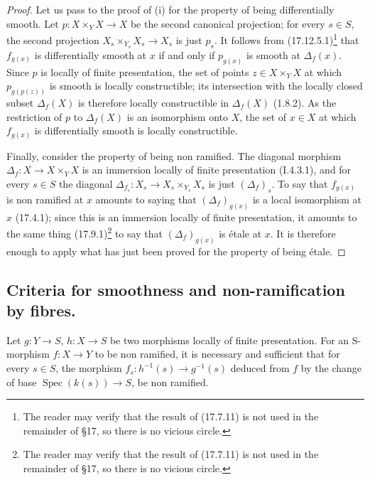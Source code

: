 \begin{proof}
Let us pass to the proof of (i) for the property of being differentially smooth.
Let $p:X\times_Y X\to X$ be the second canonical projection; for every $s\in S$, the second projection $X_s\times_{Y_s}X_s\to X_s$ is just $p_s$.
It follows from (17.12.5.1)\footnote{The reader may verify that the result of (17.7.11) is not used in the remainder of \S17, so there is no vicious circle.} that $f_{g(x)}$ is differentially smooth at $x$ if and only if $p_{g(x)}$ is smooth at $\Delta_f(x)$.
Since $p$ is locally of finite presentation, the set of points $z\in X\times_Y X$ at which $p_{g(p(z))}$ is smooth is locally constructible; its intersection with the locally closed subset $\Delta_f(X)$ is therefore locally constructible in $\Delta_f(X)$ (1.8.2).
As the restriction of $p$ to $\Delta_f(X)$ is an isomorphism onto $X$, the set of $x\in X$ at which $f_{g(x)}$ is differentially smooth is locally constructible.

Finally, consider the property of being non ramified.
The diagonal morphism $\Delta_f:X\to X\times_Y X$ is an immersion locally of finite presentation (I.4.3.1), and for every $s\in S$ the diagonal $\Delta_{f_s}:X_s\to X_s\times_{Y_s}X_s$ is just $(\Delta_f)_s$.
To say that $f_{g(x)}$ is non ramified at $x$ amounts to saying that $(\Delta_f)_{g(x)}$ is a local isomorphism at $x$ (17.4.1); since this is an immersion locally of finite presentation, it amounts to the same thing (17.9.1)\footnote{The reader may verify that the result of (17.7.11) is not used in the remainder of \S17, so there is no vicious circle.} to say that $(\Delta_f)_{g(x)}$ is \'etale at $x$.
It is therefore enough to apply what has just been proved for the property of being \'etale.
\end{proof}


\subsection{Criteria for smoothness and non-ramification by fibres.}
\label{subsection:IV.17.8}
\label{IV.17.8}


\begin{proposition}[17.8.1]
\label{IV.17.8.1}
Let $g:Y\to S$, $h:X\to S$ be two morphisms locally of finite presentation.
For an S-morphism $f:X\to Y$ to be non ramified, it is necessary and sufficient that for every $s\in S$, the morphism $f_s:h^{-1}(s)\to g^{-1}(s)$ deduced from $f$ by the change of base $\operatorname{Spec}(k(s))\to S$, be non ramified.
\end{proposition}

